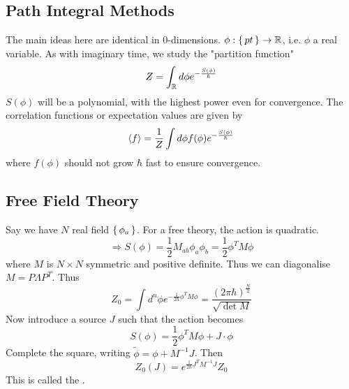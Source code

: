 \documentclass{article}
\begin{document}
\subsection{Path Integral Methods} 
The main ideas here are identical in 0-dimensions. $\phi:\set{pt}\to\mathbb{R}$, i.e. $\phi$ a real variable. As with imaginary time, we study the "partition function"
\[
Z = \int_{\mathbb{R}} d\phi e^{-\frac{S(\phi)}{\hbar}}
\]
$S(\phi)$ will be a polynomial, with the highest power even for convergence. The  correlation functions or expectation values are given by 
\[
\braket{ f } = \frac{1}{Z} \int d\phi f(\phi) e^{-\frac{S(\phi)}{\hbar}}
\]
where $f(\phi)$ should not grow $\hbar$ fast to ensure convergence. 

\subsection{Free Field Theory}
Say we have $N$ real field $\set{\phi_a}$. For a free theory, the action is quadratic. 
\[
\Rightarrow S(\phi) = \frac{1}{2} M_{ab} \phi_a \phi_b = \frac{1}{2} \phi^T M \phi 
\]
where $M$ is $N\times N$ symmetric and positive definite. Thus we can diagonalise $M= P\Lambda P^T$. Thus 
\[
Z_0 = \int d^n \phi e^{-\frac{1}{2\hbar}\phi^T M \phi} = \frac{(2\pi\hbar)^{\frac{N}{2}}}{\sqrt{\det M}}
\]
Now introduce a source $J$ such that the action becomes 
\[
S(\phi) = \frac{1}{2} \phi^T M \phi  + J\cdot\phi
\]
Complete the square, writing $\tilde{\phi} = \phi + M^{-1}J$. Then 
\[
Z_0(J) = e^{\frac{1}{2\hbar}J^T M^{-1}J}Z_0
\]
This is called the .
\end{document}
